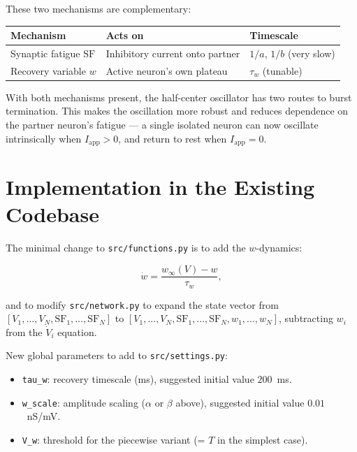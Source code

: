 \documentclass[11pt]{article}
\begin{document}
These two mechanisms are complementary:

\begin{center}
\begin{tabular}{lll}
\toprule
Mechanism       & Acts on          & Timescale \\
\midrule
Synaptic fatigue $\mathrm{SF}$ & Inhibitory current onto partner & $1/a$, $1/b$ (very slow) \\
Recovery variable $w$          & Active neuron's own plateau     & $\tau_w$ (tunable) \\
\bottomrule
\end{tabular}
\end{center}

With both mechanisms present, the half-center oscillator has two routes to burst
termination. This makes the oscillation more robust and reduces dependence on the
partner neuron's fatigue — a single isolated neuron can now oscillate intrinsically
when $I_{\mathrm{app}} > 0$, and return to rest when $I_{\mathrm{app}} = 0$.

\section{Implementation in the Existing Codebase}

The minimal change to \texttt{src/functions.py} is to add the $w$-dynamics:

\begin{equation}
    \dot{w} = \frac{w_\infty(V) - w}{\tau_w},
\end{equation}

and to modify \texttt{src/network.py} to expand the state vector from
$[V_1, \ldots, V_N, \mathrm{SF}_1, \ldots, \mathrm{SF}_N]$ to
$[V_1, \ldots, V_N, \mathrm{SF}_1, \ldots, \mathrm{SF}_N, w_1, \ldots, w_N]$,
subtracting $w_i$ from the $\dot{V}_i$ equation.

New global parameters to add to \texttt{src/settings.py}:
\begin{itemize}
    \item \texttt{tau\_w}: recovery timescale (ms), suggested initial value $200$~ms.
    \item \texttt{w\_scale}: amplitude scaling ($\alpha$ or $\beta$ above), suggested
          initial value $0.01$~nS/mV.
    \item \texttt{V\_w}: threshold for the piecewise variant (= $T$ in the simplest case).
\end{itemize}
\end{document}
